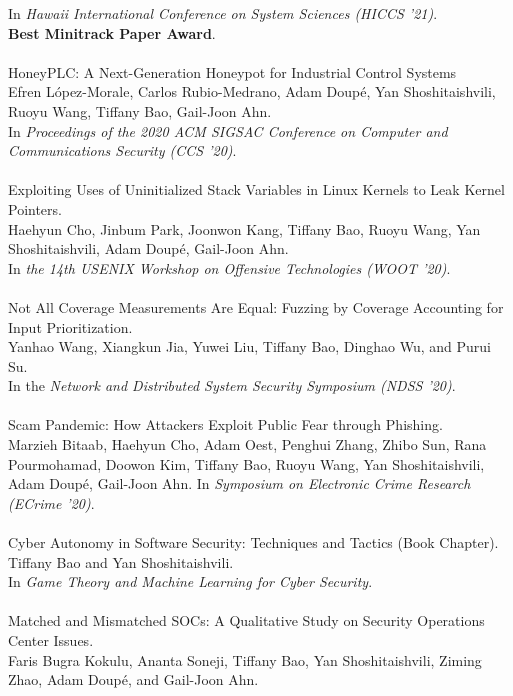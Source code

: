 In \emph{Hawaii International Conference on System Sciences (HICCS '21)}. \\
\textbf{Best Minitrack Paper Award}.
\\\\
HoneyPLC: A Next-Generation Honeypot for Industrial Control Systems \\
Efren L\'{o}pez-Morale, Carlos Rubio-Medrano, Adam Doup\'{e}, Yan Shoshitaishvili, Ruoyu Wang, Tiffany Bao, Gail-Joon Ahn.\\
In \emph{Proceedings of the 2020 ACM SIGSAC Conference on Computer and Communications Security (CCS '20)}.
\\\\
Exploiting Uses of Uninitialized Stack Variables in Linux Kernels to Leak Kernel Pointers. \\
Haehyun Cho, Jinbum Park, Joonwon Kang, Tiffany Bao, Ruoyu Wang, Yan Shoshitaishvili, Adam Doup\'{e}, Gail-Joon Ahn. \\
In \emph{the 14th USENIX Workshop on Offensive Technologies (WOOT '20)}.
\\\\
Not All Coverage Measurements Are Equal: Fuzzing by Coverage Accounting for Input Prioritization. \\
Yanhao Wang, Xiangkun Jia, Yuwei Liu, Tiffany Bao, Dinghao Wu, and Purui Su. \\
In the \emph{Network and Distributed System Security Symposium (NDSS '20)}.
\\\\
Scam Pandemic: How Attackers Exploit Public Fear through Phishing. \\
Marzieh Bitaab, Haehyun Cho, Adam Oest, Penghui Zhang, Zhibo Sun, Rana Pourmohamad, Doowon Kim, Tiffany Bao, Ruoyu Wang, Yan Shoshitaishvili, Adam Doup\'{e}, Gail-Joon Ahn.
In \emph{Symposium on Electronic Crime Research (ECrime '20)}.
\\\\
%
Cyber Autonomy in Software Security: Techniques and Tactics (Book Chapter). \\
Tiffany Bao and Yan Shoshitaishvili. \\
In \emph{Game Theory and Machine Learning for Cyber Security}.
\\\\
Matched and Mismatched SOCs: A Qualitative Study on Security Operations Center Issues. \\
Faris Bugra Kokulu, Ananta Soneji, Tiffany Bao, Yan Shoshitaishvili, Ziming Zhao, Adam Doup\'{e}, and Gail-Joon Ahn. \\
